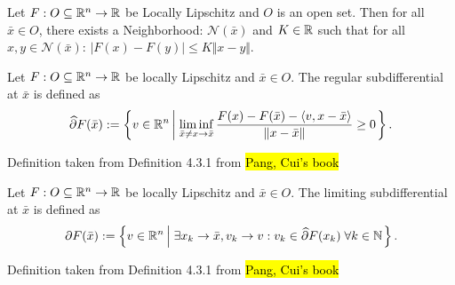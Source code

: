 \documentclass[12pt]{article}
\begin{document}
        \begin{definition}
            Let $F: O \subseteq \mathbb R^n \rightarrow \mathbb R$ be Locally Lipschitz and $O$ is an open set. 
            Then for all $\bar x \in O$, there exists a Neighborhood: $\mathcal N(\bar x)$ and $K \in \mathbb R$ such that for all $x, y \in \mathcal N(\bar x)$: $|F(x) - F(y)| \le K \Vert x - y\Vert$. 
        \end{definition}
        \begin{definition}
            Let $F: O \subseteq \mathbb R^n \rightarrow \mathbb R$ be locally Lipschitz and $\bar x \in O$. 
            The regular subdifferential at $\bar x$ is defined as 
            \begin{align*}
                \widehat \partial F(\bar x) := 
                \left\lbrace
                    v \in \mathbb R^n \left| \; 
                        \liminf_{\bar x \neq x\rightarrow \bar x}
                        \frac{F(x) - F(\bar x) - \langle v, x - \bar x\rangle}{\Vert x - \bar x\Vert} 
                        \ge 0
                    \right.
                \right\rbrace. 
            \end{align*}
        \end{definition}
        \begin{remark}
            Definition taken from Definition 4.3.1 from 
            \hl{Pang, Cui's book} \cite{ying_modern_2021}
        \end{remark}
        \begin{definition}
            Let $F: O \subseteq \mathbb R^n \rightarrow \mathbb R$ be locally Lipschitz and $\bar x \in O$. 
            The limiting subdifferential at $\bar x$ is defined as 
            \begin{align*}
                \partial F(\bar x) := 
                \left\lbrace
                    v \in \mathbb R^n \left| \; 
                        \exists x_k \rightarrow \bar x, v_k \rightarrow v: 
                        v_k \in \widehat \partial F(x_k) \;\forall k \in \mathbb N
                    \right.
                \right\rbrace. 
            \end{align*}
        \end{definition}
        \begin{remark}
            Definition taken from Definition 4.3.1 from
            {\hl{Pang, Cui's book}} \cite{ying_modern_2021}
        \end{remark}
\end{document}
